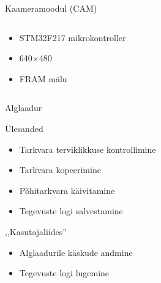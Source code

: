 \documentclass[pdf,draft]{beamer}
\begin{document}
\begin{frame}{Kaameramoodul (CAM)}
    \begin{columns}
        \begin{column}{0.5\textwidth}
            \begin{itemize}
                \item STM32F217 mikrokontroller
                \item 640\(\times\)480 
                \item FRAM mälu
            \end{itemize}
        \end{column}
        \begin{column}{0.5\textwidth}
        \end{column}
    \end{columns}
\end{frame}

\begin{frame}{Alglaadur}
    \begin{block}{Ülesanded}
        \begin{itemize}
            \item Tarkvara terviklikkuse kontrollimine
            \item Tarkvara kopeerimine
            \item Põhitarkvara käivitamine
            \item Tegevuste logi salvestamine
        \end{itemize}
    \end{block}
    \begin{block}{,,Kasutajaliides''}
        \begin{itemize}
            \item Alglaadurile käskude andmine
            \item Tegevuste logi lugemine
        \end{itemize}
    \end{block}
\end{frame}
\end{document}
